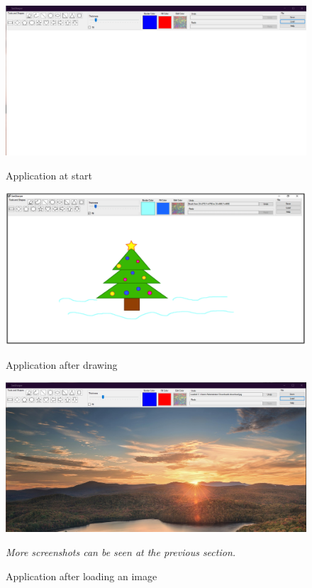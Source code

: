 \documentclass[12pt]{article}
\begin{document}
\begin{figure}[h]
\centering
\includegraphics[width=11.5cm]{graphics/seesharper_empty.png}
\caption{Application at start}

\includegraphics[width=11.5cm]{graphics/seesharper_drawing.png}
\caption{Application after drawing}

\includegraphics[width=11.5cm]{graphics/loaded_img.png}
\caption{Application after loading an image}

\textit{More screenshots can be seen at the previous section.}
\end{figure}
\end{document}
